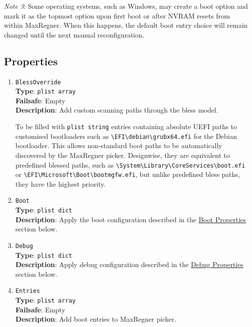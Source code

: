 \documentclass[]{article}
\makeatletter
\renewcommand{\label}[1]{%
\zref@wrapper@immediate{\oldlabel{#1}}}  %
\makeatother
\begin{document}
\emph{Note 3}: Some operating systems, such as Windows, may create a boot option and mark it as
the topmost option upon first boot or after NVRAM resets from within MaxRegner. When this happens,
the default boot entry choice will remain changed until the next manual reconfiguration.

\subsection{Properties}\label{miscprops}

\begin{enumerate}

\item
  \texttt{BlessOverride}\\
  \textbf{Type}: \texttt{plist\ array}\\
  \textbf{Failsafe}: Empty\\
  \textbf{Description}: Add custom scanning paths through the bless model.

  To be filled with \texttt{plist\ string} entries containing
  absolute UEFI paths to customised bootloaders such as
  \texttt{\textbackslash EFI\textbackslash debian\textbackslash grubx64.efi}
  for the Debian bootloader. This allows non-standard boot paths to be automatically
  discovered by the MaxRegner picker. Designwise, they are equivalent to predefined blessed paths, such as
  \texttt{\textbackslash System\textbackslash Library\textbackslash CoreServices\textbackslash boot.efi}
  or \texttt{\textbackslash EFI\textbackslash Microsoft\textbackslash Boot\textbackslash bootmgfw.efi},
  but unlike predefined bless paths, they have the highest priority.

\item
  \texttt{Boot}\\
  \textbf{Type}: \texttt{plist\ dict}\\
  \textbf{Description}: Apply the boot configuration described in the
  \hyperref[miscbootprops]{Boot Properties} section below.

\item
  \texttt{Debug}\\
  \textbf{Type}: \texttt{plist\ dict}\\
  \textbf{Description}: Apply debug configuration described in the
  \hyperref[miscdebugprops]{Debug Properties} section below.

\item
  \texttt{Entries}\\
  \textbf{Type}: \texttt{plist\ array}\\
  \textbf{Failsafe}: Empty\\
  \textbf{Description}: Add boot entries to MaxRegner picker.


\end{enumerate}
\end{document}
